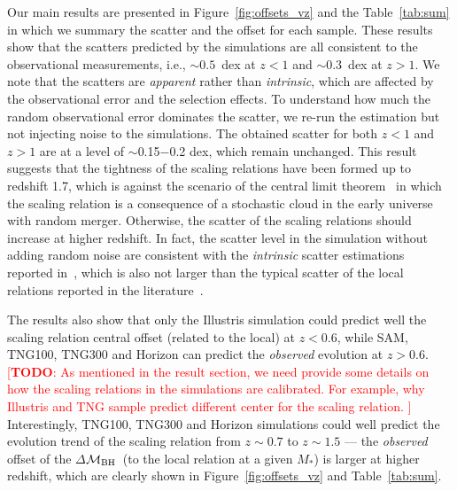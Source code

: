 \documentclass[twocolumn]{aastex631}
\newcommand{\todo}[1]{\textcolor{red}{[{\bf TODO}: #1]}}
\def\smass{{$M_*$}}
\def\mbh{$\mathcal M_{\rm BH}$}
\begin{document}
Our main results are presented in Figure~\ref{fig:offsets_vz} and the Table~\ref{tab:sum} in which we summary the scatter and the offset for each sample. These results show that the scatters predicted by the simulations are all consistent to the observational measurements, i.e., $\sim0.5$~dex at $z<1$ and $\sim0.3$~dex at $z>1$. We note that the scatters are {\it apparent} rather than {\it intrinsic}, which are affected by the observational error and the selection effects. To understand how much the random observational error dominates the scatter, we re-run the estimation but not injecting noise to the simulations. The obtained scatter for both $z<1$ and $z>1$ are at a level of $\sim$0.15$-$0.2 dex, which remain unchanged. This result suggests that the tightness of the scaling relations have been formed up to redshift 1.7, which is against the scenario of the central limit theorem~\citep{Peng2007, Jahnke2011, Hirschmann2010} in which the scaling relation is a consequence of a stochastic cloud in the early universe with random merger. Otherwise, the scatter of the scaling relations should increase at higher redshift. In fact, the scatter level in the simulation without adding random noise are consistent with the {\it intrinsic} scatter estimations reported in~\citet{Ding2020, 2021arXiv210902751L}, which is also not larger than the typical scatter of the local relations reported in the literature~\citep[][i.e., $\gtrsim0.35$~dex]{Kormendy13, Gul++09, Reines2015}.

The results also show that only the Illustris simulation could predict well the scaling relation central offset (related to the local) at $z<0.6$, while SAM, TNG100, TNG300 and Horizon can predict the {\it observed} evolution at $z>0.6$. \todo{As mentioned in the result section, we need provide some details on how the scaling relations in the simulations are calibrated. For example, why Illustris and TNG sample predict different center for the scaling relation. }
Interestingly, TNG100, TNG300 and Horizon simulations could well predict the evolution trend of the scaling relation from $z\sim0.7$ to $z\sim1.5$ --- the  {\it observed} offset of the $\Delta$\mbh\ (to the local relation at a given \smass) is larger at higher redshift, which are clearly shown in Figure~\ref{fig:offsets_vz} and Table~\ref{tab:sum}.
\end{document}
